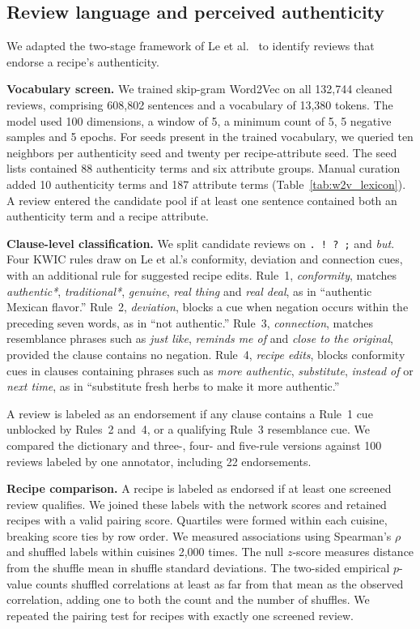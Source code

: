 \subsection*{Review language and perceived authenticity}
We adapted the two-stage framework of Le et al.\ \cite{le2022authenticity} to identify reviews that endorse a recipe's authenticity.

\textbf{Vocabulary screen.} We trained skip-gram Word2Vec \cite{mikolov2013word2vec} on all 132,744 cleaned reviews, comprising 608,802 sentences and a vocabulary of 13,380 tokens. The model used 100 dimensions, a window of 5, a minimum count of 5, 5 negative samples and 5 epochs. For seeds present in the trained vocabulary, we queried ten neighbors per authenticity seed and twenty per recipe-attribute seed. The seed lists contained 88 authenticity terms and six attribute groups. Manual curation added 10 authenticity terms and 187 attribute terms (Table~\ref{tab:w2v_lexicon}). A review entered the candidate pool if at least one sentence contained both an authenticity term and a recipe attribute.

\textbf{Clause-level classification.} We split candidate reviews on \texttt{. ! ? ;} and \emph{but}. Four KWIC rules draw on Le et al.'s conformity, deviation and connection cues, with an additional rule for suggested recipe edits. Rule~1, \emph{conformity}, matches \emph{authentic*}, \emph{traditional*}, \emph{genuine}, \emph{real thing} and \emph{real deal}, as in ``authentic Mexican flavor.'' Rule~2, \emph{deviation}, blocks a cue when negation occurs within the preceding seven words, as in ``not authentic.'' Rule~3, \emph{connection}, matches resemblance phrases such as \emph{just like}, \emph{reminds me of} and \emph{close to the original}, provided the clause contains no negation. Rule~4, \emph{recipe edits}, blocks conformity cues in clauses containing phrases such as \emph{more authentic}, \emph{substitute}, \emph{instead of} or \emph{next time}, as in ``substitute fresh herbs to make it more authentic.''

A review is labeled as an endorsement if any clause contains a Rule~1 cue unblocked by Rules~2 and~4, or a qualifying Rule~3 resemblance cue. We compared the dictionary and three-, four- and five-rule versions against 100 reviews labeled by one annotator, including 22 endorsements.

\textbf{Recipe comparison.} A recipe is labeled as endorsed if at least one screened review qualifies. We joined these labels with the network scores and retained recipes with a valid pairing score. Quartiles were formed within each cuisine, breaking score ties by row order. We measured associations using Spearman's $\rho$ and shuffled labels within cuisines 2,000 times. The null $z$-score measures distance from the shuffle mean in shuffle standard deviations. The two-sided empirical $p$-value counts shuffled correlations at least as far from that mean as the observed correlation, adding one to both the count and the number of shuffles. We repeated the pairing test for recipes with exactly one screened review.

